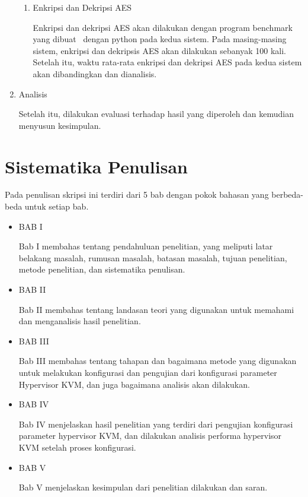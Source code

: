 \begin{enumerate}
\begin{enumerate}
                  \item Enkripsi dan Dekripsi AES

                        Enkripsi dan dekripsi AES akan dilakukan dengan program benchmark yang dibuat \saya\ dengan python pada kedua sistem. Pada masing-masing sistem, enkripsi dan dekripsis AES akan dilakukan sebanyak 100 kali. Setelah itu, waktu rata-rata enkripsi dan dekripsi AES pada kedua sistem akan dibandingkan dan dianalisis.
            \end{enumerate}

      \item Analisis

            Setelah itu, dilakukan evaluasi terhadap hasil yang diperoleh dan kemudian menyusun kesimpulan.
\end{enumerate}


\section{Sistematika Penulisan}
Pada penulisan skripsi ini terdiri dari 5 bab dengan pokok bahasan yang berbeda-beda untuk setiap bab.
\begin{itemize}
      \item BAB I \babSatu

            Bab I membahas tentang pendahuluan penelitian, yang meliputi latar belakang masalah, rumusan masalah, batasan masalah, tujuan penelitian, metode penelitian, dan sistematika penulisan.

      \item BAB II \babDua

            Bab II membahas tentang landasan teori yang digunakan untuk memahami dan menganalisis hasil penelitian.

      \item BAB III \babTiga

            Bab III membahas tentang tahapan dan bagaimana metode yang digunakan untuk melakukan konfigurasi dan pengujian dari konfigurasi parameter Hypervisor KVM, dan juga bagaimana analisis akan dilakukan.

      \item BAB IV \babEmpat

            Bab IV menjelaskan hasil penelitian yang terdiri dari pengujian konfigurasi parameter hypervisor KVM, dan dilakukan analisis performa hypervisor KVM setelah proses konfigurasi.

      \item BAB V \babLima

            Bab V menjelaskan kesimpulan dari penelitian dilakukan dan saran.
\end{itemize}